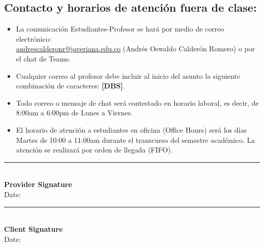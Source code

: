 \documentclass[11pt]{article}
\begin{document}
\subsection{Contacto y horarios de atención fuera de clase:}\label{contacto-y-horarios-de-atenciuxf3n-fuera-de-clase}
\begin{itemize}
    \item La comunicación Estudiantes-Profesor se hará por medio de correo electrónico: \\  \href{mailto:///andrescalderonr@javeriana.edu.co}{andrescalderonr@javeriana.edu.co} (Andrés Oswaldo Calderón Romero) o por el chat de Teams.
    \item Cualquier correo al profesor debe incluir al inicio del asunto la siguiente combinación de caracteres: \textbf{{[}DBS{]}}.
    \item Todo correo o mensaje de chat será contestado en horario laboral, es decir, de 8:00am a 6:00pm de Lunes a Viernes.
    \item El horario de atención a estudiantes en oficina (Office Hours) será los días Martes de 10:00 a 11:00am durante el transcurso del semestre académico. La atención se realizará por orden de llegada (FIFO).
\end{itemize}

\vspace{4em}

\begin{minipage}[t]{0.45\textwidth}

    

    \vspace{-17mm}
    \noindent \rule{\textwidth}{0.4pt} \\ %
    \textbf{Provider Signature} \\
    Date: \makebox[1.5in]{\textbf{\today}}
\end{minipage}
\hfill
\begin{minipage}[t]{0.45\textwidth}
    \vspace{-6mm}
    \noindent \rule{\textwidth}{0.4pt} \\
    \textbf{Client Signature} \\
    Date: \makebox[1.5in]{\hrulefill}
\end{minipage}
\end{document}
